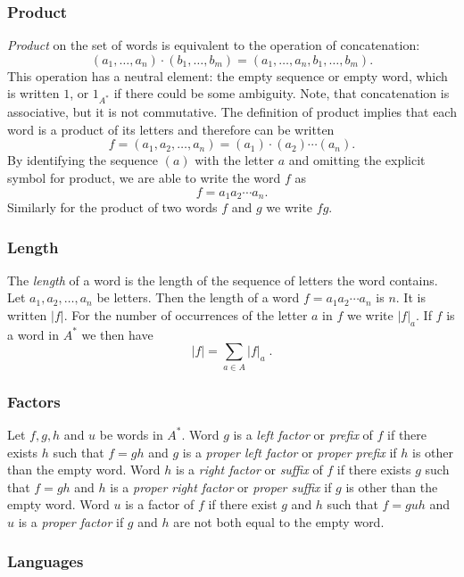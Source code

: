 \subsubsection*{Product}

\emph{Product} on the set of words is equivalent to the operation of concatenation:
\[
    (a_1, \dotsc, a_n) \cdot (b_1, \dotsc, b_m) = (a_1, \dotsc, a_n, b_1, \dotsc, b_m).
\]
This operation has a neutral element: the empty sequence or empty word, which is written $1$, or $1_{A^*}$ if there could be some ambiguity. Note, that concatenation is associative, but it is not commutative. The definition of product implies that each word is a product of its letters and therefore can be written
\[
    f = (a_1, a_2, \dotsc, a_n) = (a_1) \cdot (a_2) \dotsm (a_n).
\]
By identifying the sequence $(a)$ with the letter $a$ and omitting the explicit symbol for product, we are able to write the word $f$ as
\[
    f = a_1 a_2 \dotsm a_n.
\]
Similarly for the product of two words $f$ and $g$ we write $fg$.

\subsubsection*{Length}

The \emph{length} of a word is the length of the sequence of letters the word contains. Let $a_1, a_2, \dotsc, a_n$ be letters. Then the length of a word $f = a_1 a_2 \dotsm a_n$ is $n$. It is written $|f|$. For the number of occurrences of the letter $a$ in $f$ we write $|f|_a$. If $f$ is a word in $A^*$ we then have
\[
    |f| = \sum_{a \in A} |f|_a \; .
\]

\subsubsection*{Factors}

Let $f, g, h$ and $u$ be words in $A^*$. Word $g$ is a \emph{left factor} or \emph{prefix} of $f$ if there exists $h$ such that $f = g h$ and $g$ is a \emph{proper left factor} or \emph{proper prefix} if $h$ is other than the empty word. Word $h$ is a \emph{right factor} or \emph{suffix} of $f$ if there exists $g$ such that $f = g h$ and $h$ is a \emph{proper right factor} or \emph{proper suffix} if $g$ is other than the empty word. Word $u$ is a factor of $f$ if there exist $g$ and $h$ such that $f = g u h$ and $u$ is a \emph{proper factor} if $g$ and $h$ are not both equal to the empty word.

\subsubsection*{Languages}

